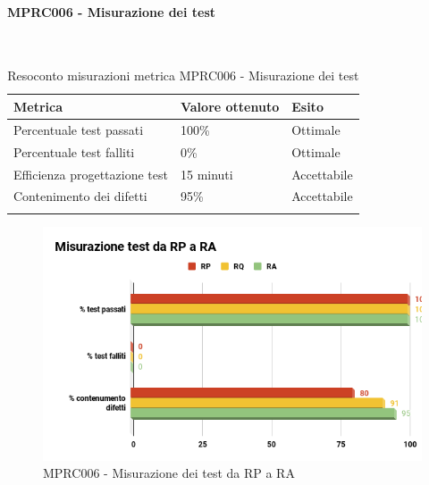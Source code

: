 \paragraph{MPRC006 - Misurazione dei test}\mbox{}\\[0.4cm]
\begin{center}
	\centering
	\renewcommand{\arraystretch}{1.5}
	\begin{longtable}{  p{5cm}  p{5cm} p{3cm}  }
		\rowcolor{tableHeadYellow}
		\textbf{Metrica}   & \textbf{Valore ottenuto} & \textbf{Esito} \\ 
		\endhead
		Percentuale test passati     & 100\%  & Ottimale \\
		Percentuale test falliti     & 0\% & Ottimale \\
		Efficienza progettazione test    & 15 minuti & Accettabile \\
		Contenimento dei difetti    & 95\% & Accettabile \\
		\rowcolor{white}
		\caption{Resoconto misurazioni metrica MPRC006 - Misurazione dei test}
	\end{longtable}
\end{center}
\begin{figure}[H]
	\centering
	\includegraphics[width=13cm,keepaspectratio]{../includes/pics/MisurazioneRA.png}
	\caption{\label{fig:mission}MPRC006 - Misurazione dei test da RP a RA}
\end{figure}

